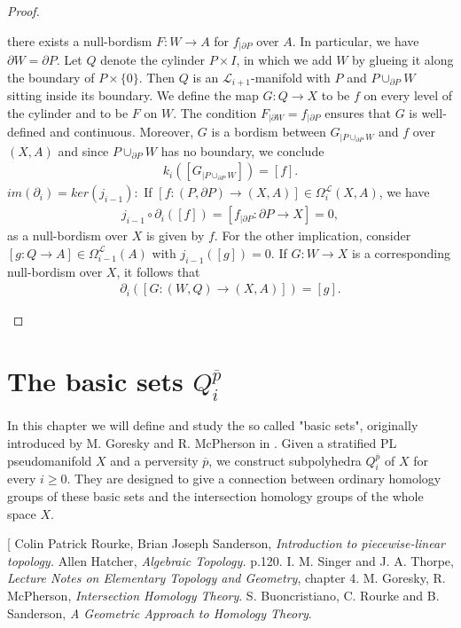 \documentclass[11pt]{book}
\begin{document}
\begin{proof}
\begin{itemize}
there exists a null-bordism $F: W \to A$ for $f_{| \partial P}$ over $A$. In particular, we have $\partial W= \partial P$. Let $Q$ denote the cylinder $P \times I$, in which we add $W$ by glueing it along the boundary of $P \times \{ 0 \}$. Then $Q$ is an $\mathcal{L}_{i+1}$-manifold with $P$ and $P \cup_{\partial P} W$ sitting inside its boundary. We define the map $G: Q \to X$ to be $f$ on every level of the cylinder and to be $F$ on $W$. The condition $F_{| \partial W}=f_{| \partial P}$ ensures that $G$ is well-defined and continuous. Moreover, $G$ is a bordism between $G_{|P \cup_{\partial P} W}$ and $f$ over $(X,A)$ and since $P \cup_{\partial P} W$ has no boundary, we conclude 
\begin{align*}
k_i([G_{|P \cup_{\partial P} W}])=[f].
\end{align*}
$im(\partial_i)= ker(j_{i-1}):$ If $[f:(P, \partial P) \to (X,A)] \in \Omega_{i}^{\mathcal{L}}(X,A)$, we have 
\begin{align*}
j_{i-1} \circ \partial_i ([f])= [f_{| \partial P}: \partial P \to X] = 0,
\end{align*}
as a null-bordism over $X$ is given by $f$. For the other implication, consider $[g: Q \to A] \in \Omega_{i-1}^{\mathcal{L}}(A)$ with $j_{i-1}([g])=0$. If $G: W \to X$ is a corresponding null-bordism over $X$, it follows that
\begin{align*}
\partial_i([G: (W,Q) \to (X,A)]) = [g].
\end{align*}
\end{itemize}
\end{proof}

\chapter{The basic sets $Q_i^{\overline{p}}$}
In this chapter we will define and study the so called "basic sets", originally introduced by M. Goresky and R. McPherson in \cite{GM}. Given a stratified PL pseudomanifold $X$ and a perversity $\overline{p}$, we construct subpolyhedra $Q_i^{\overline{p}}$ of $X$ for every $i \geq 0$. They are designed to give a connection between ordinary homology groups of these basic sets and the intersection homology groups of the whole space $X$.



\begin{thebibliography}[
Colin Patrick Rourke, Brian Joseph Sanderson, \textit{Introduction to piecewise-linear topology.}
Allen Hatcher, \textit{Algebraic Topology.} p.120.
I. M. Singer and J. A. Thorpe, \textit{Lecture Notes on Elementary Topology and Geometry}, chapter 4.
M. Goresky, R. McPherson, \textit{Intersection Homology Theory}.
S. Buoncristiano, C. Rourke and B. Sanderson, \textit{A Geometric Approach to Homology Theory}.
\end{thebibliography}
\end{document}
